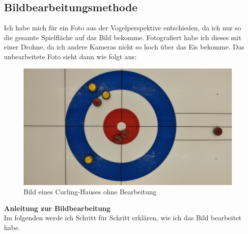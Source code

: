 \documentclass[11pt]{article}
\begin{document}
    \subsection{Bildbearbeitungsmethode}
    Ich habe mich für ein Foto aus der Vogelperspektive entschieden, da ich nur so die gesamte Spielfläche
    auf das Bild bekomme. Fotografiert habe ich dieses mit einer Drohne, da ich andere Kameras nicht so hoch
    über das Eis bekomme. Das unbearbeitete Foto sieht dann wie folgt aus:\\
    \begin{figure}[h]
        \includegraphics[width=\textwidth]{media/unedited}
        \caption{Bild eines Curling-Hauses ohne Bearbeitung}
    \end{figure}

    \pagebreak

    \textbf{Anleitung zur Bildbearbeitung}\\
    Im folgenden werde ich Schritt für Schritt erklären, wie ich das Bild bearbeitet habe.
\end{document}
